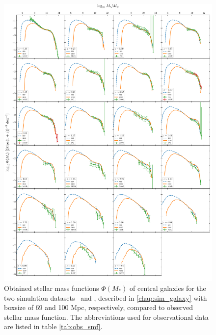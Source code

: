 \begin{figure}[H]
	\centering
	\includegraphics[width=\textwidth]{images/smf/smf_both_sims.pdf}%
	\caption{
		Obtained stellar mass functions $\Phi(M_*)$ of central galaxies for the two simulation datasets \gsmall\ and \glarge, described in \ref{chap:sim_galaxy} with boxsize of 69 and 100 Mpc, respectively, compared to observed stellar mass function.
		The abbreviations used for observational data are listed in table \ref{tab:obs_smf}.
	}%
	\label{fig:smf}
\end{figure}


















